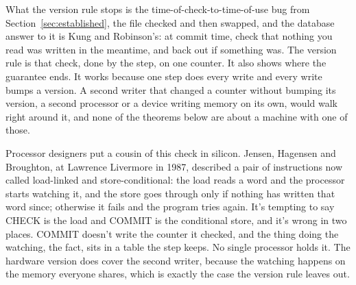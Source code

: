 \documentclass[11pt,twoside]{article}
\theoremstyle{thielethm}
\theoremstyle{thieledef}
\theoremstyle{thieledef}
\theoremstyle{thieledef}
\theoremstyle{thielethm}
\theoremstyle{thieleobs}
\theoremstyle{thielethm}
\begin{document}
What the version rule stops is the time-of-check-to-time-of-use bug from Section~\ref{sec:established}, the file checked and then swapped,
and the database answer to it is Kung and Robinson's: at commit time, check that nothing you read
was written in the meantime, and back out if something was. The version rule is that check, done
by the step, on one counter. It also shows where the guarantee ends. It works because one step does
every write and every write bumps a version. A second writer that changed a counter without
bumping its version, a second processor or a device writing memory on its own, would walk
right around it, and none of the theorems below are about a machine with one of those.

Processor designers put a cousin of this check in silicon. Jensen, Hagensen and Broughton, at
Lawrence Livermore in 1987, described a pair of instructions now called load-linked and
store-conditional: the load reads a word and the processor starts watching it, and the store
goes through only if nothing has written that word since; otherwise it fails and the program
tries again. It's tempting to say CHECK is the load and COMMIT is the conditional store, and
it's wrong in two places. COMMIT doesn't write the counter it checked, and the thing doing the
watching, the fact, sits in a table the step keeps. No single processor holds it. The hardware
version does cover the second writer, because the watching happens on the memory everyone
shares, which is exactly the case the version rule leaves out.
\end{document}
